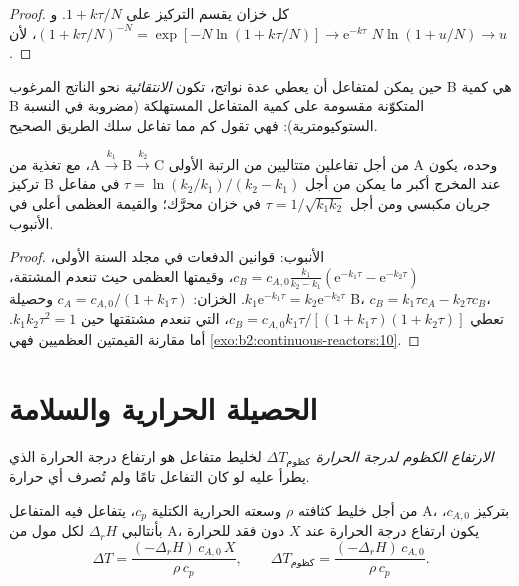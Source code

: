 \begin{proof}
كل خزان يقسم التركيز على $1 + k\tau/N$. و$(1 +
k\tau/N)^{-N} = \exp[-N\ln(1 + k\tau/N)] \to \mathrm e^{-k\tau}$، لأن
$N\ln(1 + u/N) \to u$.
\end{proof}

\begin{definition}[الانتقائية]\label{def:b2:continuous-reactors:selectivity}
حين يمكن لمتفاعل أن يعطي عدة نواتج، تكون \emph{الانتقائية}
نحو الناتج المرغوب B هي كمية B المتكوّنة مقسومة على كمية
المتفاعل المستهلكة (مضروبة في النسبة الستوكيومترية): فهي تقول كم مما
تفاعل سلك الطريق الصحيح.
\end{definition}

\begin{proposition}\label{prop:b2:continuous-reactors:consecutive}
من أجل تفاعلين متتاليين من الرتبة الأولى $\mathrm A \xrightarrow{k_1} \mathrm B
\xrightarrow{k_2} \mathrm C$، مع تغذية من A وحده، يكون تركيز B
عند المخرج أكبر ما يمكن من أجل $\tau = \ln(k_2/k_1)/(k_2 - k_1)$ في
مفاعل جريان مكبسي ومن أجل $\tau = 1/\sqrt{k_1k_2}$ في خزان محرَّك؛ والقيمة
العظمى أعلى في الأنبوب.
\end{proposition}

\begin{proof}
الأنبوب: قوانين الدفعات في مجلد السنة الأولى، $c_B = c_{A,0}\frac{k_1}{k_2 - k_1}
(\mathrm e^{-k_1\tau} - \mathrm e^{-k_2\tau})$، وقيمتها العظمى حيث تنعدم
المشتقة، $k_1\mathrm e^{-k_1\tau} = k_2\mathrm e^{-k_2\tau}$. الخزان: $c_A =
c_{A,0}/(1 + k_1\tau)$ وحصيلة B، $c_B = k_1\tau c_A - k_2\tau c_B$،
تعطي $c_B = c_{A,0}k_1\tau/[(1 + k_1\tau)(1 + k_2\tau)]$، التي تنعدم مشتقتها
حين $k_1k_2\tau^2 = 1$. أما مقارنة القيمتين العظميين فهي
\cref{exo:b2:continuous-reactors:10}.
\end{proof}

\section{الحصيلة الحرارية والسلامة}

\begin{definition}\label{def:b2:continuous-reactors:adiabatic-rise}
\emph{الارتفاع الكظوم لدرجة الحرارة}
$\Delta T_{\text{كظوم}}$ لخليط متفاعل هو ارتفاع درجة الحرارة الذي
يطرأ عليه لو كان التفاعل تامًا ولم تُصرف أي حرارة.
\end{definition}

\begin{proposition}\label{prop:b2:continuous-reactors:adiabatic}
من أجل خليط كثافته $\rho$ وسعته الحرارية الكتلية $c_p$، يتفاعل فيه
المتفاعل A، بتركيز $c_{A,0}$، بأنتالبي
$\Delta_r H$ لكل مول من A، يكون ارتفاع درجة الحرارة عند  $X$ دون
فقد للحرارة
\[
  \Delta T = \frac{(-\Delta_r H)\,c_{A,0}\,X}{\rho\,c_p}, \qquad
  \Delta T_{\text{كظوم}} = \frac{(-\Delta_r H)\,c_{A,0}}{\rho\,c_p} .
\]
\end{proposition}

